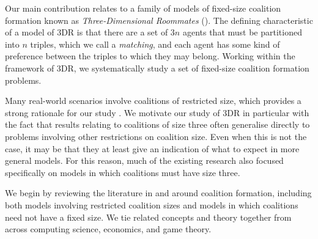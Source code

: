 Our main contribution relates to a family of models of fixed-size coalition formation known as \emph{Three-Dimensional Roommates} (). The defining characteristic of a model of 3DR is that there are a set of $3n$ agents that must be partitioned into $n$ triples, which we call a \emph{matching}, and each agent has some kind of preference between the triples to which they may belong. Working within the framework of 3DR, we systematically study a set of fixed-size coalition formation problems.

Many real-world scenarios involve coalitions of restricted size, which provides a strong rationale for our study \cite{Sless18}. We motivate our study of 3DR in particular with the fact that results relating to coalitions of size three often generalise directly to problems involving other restrictions on coalition size. Even when this is not the case, it may be that they at least give an indication of what to expect in more general models. For this reason, much of the existing research also focused specifically on models in which coalitions must have size three.

We begin by reviewing the literature in and around coalition formation, including both models involving restricted coalition sizes and models in which coalitions need not have a fixed size. We tie related concepts and theory together from across computing science, economics, and game theory.

